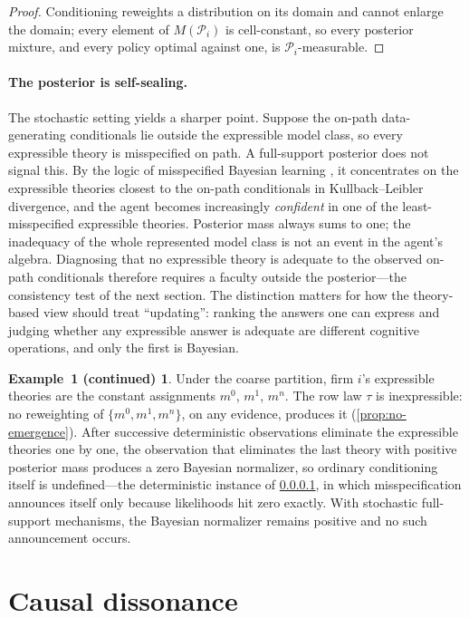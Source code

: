 \documentclass[11pt]{article}
\theoremstyle{definition}
\newtheorem*{excont}{Example~1 (continued)}
\begin{document}
\begin{proof}
Conditioning reweights a distribution on its domain and cannot enlarge the domain; every element of $M(\mathcal P_i)$ is cell-constant, so every posterior mixture, and every policy optimal against one, is $\mathcal P_i$-measurable.
\end{proof}

\paragraph{The posterior is self-sealing.}
\label{rem:self-sealing}
The stochastic setting yields a sharper point.
Suppose the on-path data-generating conditionals lie outside the expressible model class, so every expressible theory is misspecified on path.
A full-support posterior does not signal this.
By the logic of misspecified Bayesian learning \citep{Berk1966}, it concentrates on the expressible theories closest to the on-path conditionals in Kullback--Leibler divergence, and the agent becomes increasingly \emph{confident} in one of the least-misspecified expressible theories.
Posterior mass always sums to one; the inadequacy of the whole represented model class is not an event in the agent's algebra.
Diagnosing that no expressible theory is adequate to the observed on-path conditionals therefore requires a faculty outside the posterior---the consistency test of the next section.
The distinction matters for how the theory-based view should treat ``updating'': ranking the answers one can express and judging whether any expressible answer is adequate are different cognitive operations, and only the first is Bayesian.

\begin{excont}
Under the coarse partition, firm $i$'s expressible theories are the constant assignments $m^0$, $m^1$, $m^n$.
The row law $\tau$ is inexpressible: no reweighting of $\{m^0,m^1,m^n\}$, on any evidence, produces it (\cref{prop:no-emergence}).
After successive deterministic observations eliminate the expressible theories one by one, the observation that eliminates the last theory with positive posterior mass produces a zero Bayesian normalizer, so ordinary conditioning itself is undefined---the deterministic instance of \cref{rem:self-sealing}, in which misspecification announces itself only because likelihoods hit zero exactly.
With stochastic full-support mechanisms, the Bayesian normalizer remains positive and no such announcement occurs.
\end{excont}
\section{Causal dissonance}
\label{sec:dissonance}
\end{document}
